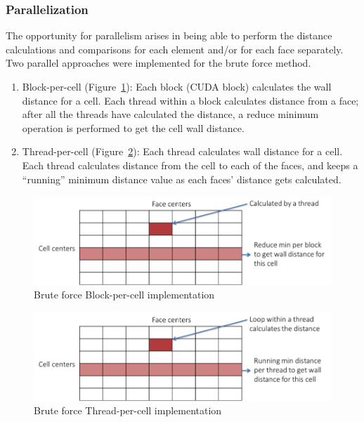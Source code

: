 \documentclass[]{aiaa-tc}%
\begin{document}
\subsubsection{Parallelization}
The opportunity for parallelism arises in being able to perform the
distance calculations and comparisons for each element and/or for each
face separately.  Two parallel approaches were implemented for the
brute force method.

\begin{enumerate}
  
  \item Block-per-cell (Figure~\ref{f:bf_3}): Each block (CUDA
    block) calculates the wall distance for a cell.  Each thread
    within a block calculates distance from a face; after all the
    threads have calculated the distance, a reduce minimum operation
    is performed to get the cell wall distance. 

  \item Thread-per-cell (Figure~\ref{f:bf_4}): Each thread calculates wall
    distance for a cell.  Each thread calculates distance from the
    cell to each of the faces, and keeps a “running” minimum distance
    value as each faces’ distance gets calculated. 

\end{enumerate}


\begin{figure}
  \includegraphics[]{figures/brute_force/bf_3}
  \caption{Brute force Block-per-cell implementation}
  \label{f:bf_3}
\end{figure}

\begin{figure}
  \includegraphics[]{figures/brute_force/bf_4}
  \caption{Brute force Thread-per-cell implementation}
  \label{f:bf_4}
\end{figure}
\end{document}
